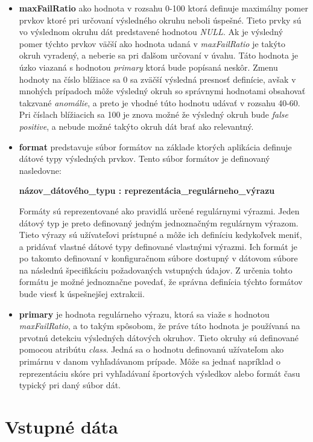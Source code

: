 \begin{itemize}
  \item \textbf{maxFailRatio} ako hodnota v rozsahu 0-100 ktorá definuje maximálny pomer prvkov ktoré pri určovaní výsledného okruhu neboli úspešné. Tieto prvky sú vo výslednom okruhu dát predstavené hodnotou \textit{NULL}. Ak je výsledný pomer týchto prvkov väčší ako hodnota udaná v \textit{maxFailRatio} je takýto okruh vyradený, a neberie sa pri ďalšom určovaní v úvahu. Táto hodnota je úzko viazaná s hodnotou \textit{primary} ktorá bude popísaná neskôr. Zmenu hodnoty na číslo blížiace sa 0 sa zväčší výsledná presnosť definície, avšak v mnohých prípadoch môže výsledný okruh so správnymi hodnotami obsahovať takzvané \textit{anomálie}, a preto je vhodné túto hodnotu udávať v rozsahu 40-60. Pri číslach blížiacich sa 100 je znova možné že výsledný okruh bude \textit{false positive}, a nebude možné takýto okruh dát brať ako relevantný.
  \item \textbf{format} predstavuje súbor formátov na základe ktorých aplikácia definuje dátové typy výsledných prvkov. Tento súbor formátov je definovaný nasledovne:
  
  \textbf{názov\_dátového\_typu : reprezentácia\_regulárneho\_výrazu}
  
  Formáty sú reprezentované ako pravidlá určené regulárnymi výrazmi. Jeden  dátový typ je preto definovaný jedným jednoznačným regulárnym výrazom. Tieto výrazy sú užívateľovi prístupné a môže ich definíciu kedykoľvek meniť, a pridávať vlastné dátové typy definované vlastnými výrazmi. Ich formát je po takomto definovaní v konfiguračnom súbore dostupný v dátovom súbore na následnú špecifikáciu požadovaných vstupných údajov. Z určenia tohto formátu je možné jednoznačne povedať, že správna definícia týchto formátov bude viesť k úspešnejšej extrakcii. 
  
  \item \textbf{primary} je hodnota regulárneho výrazu, ktorá sa viaže s hodnotou \textit{maxFailRatio}, a to takým spôsobom, že práve táto hodnota je používaná na prvotnú detekciu výsledných dátových okruhov. Tieto okruhy sú definované pomocou atribútu \textit{class}. Jedná sa o hodnotu definovanú užívateľom ako primárnu v danom vyhľadávanom prípade. Môže sa jednať napríklad o reprezentáciu skóre pri vyhľadávaní športových výsledkov alebo formát času typický pri daný súbor dát. 
\end{itemize}

\section{Vstupné dáta}

